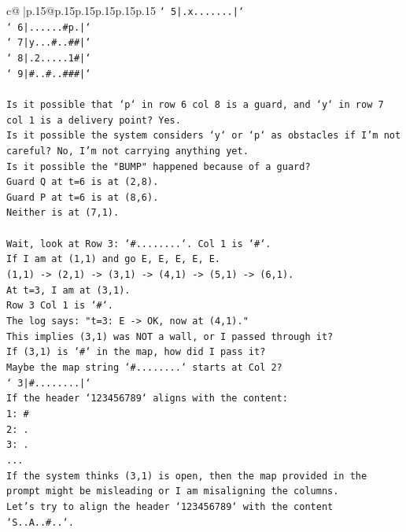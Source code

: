 \documentclass{article}
\begin{document}
{\begin{supertabular}{c@{$\;$}|p{.15\linewidth}@{}p{.15\linewidth}p{.15\linewidth}p{.15\linewidth}p{.15\linewidth}p{.15\linewidth}}
{{{\texttt{` 5|.x.......|`} \\
\texttt{` 6|......\#p.|`} \\
\texttt{` 7|y...\#..\#\#|`} \\
\texttt{` 8|.2.....1\#|`} \\
\texttt{` 9|\#..\#..\#\#\#|`} \\
\\ 
\texttt{Is it possible that `p` in row 6 col 8 is a guard, and `y` in row 7 col 1 is a delivery point? Yes.} \\
\texttt{Is it possible the system considers `y` or `p` as obstacles if I'm not careful? No, I'm not carrying anything yet.} \\
\texttt{Is it possible the "BUMP" happened because of a guard?} \\
\texttt{Guard Q at t=6 is at (2,8).} \\
\texttt{Guard P at t=6 is at (8,6).} \\
\texttt{Neither is at (7,1).} \\
\\ 
\texttt{Wait, look at Row 3: `\#........`. Col 1 is `\#`.} \\
\texttt{If I am at (1,1) and go E, E, E, E, E.} \\
\texttt{(1,1) {-}> (2,1) {-}> (3,1) {-}> (4,1) {-}> (5,1) {-}> (6,1).} \\
\texttt{At t=3, I am at (3,1).} \\
\texttt{Row 3 Col 1 is `\#`.} \\
\texttt{The log says: "t=3: E {-}> OK, now at (4,1)."} \\
\texttt{This implies (3,1) was NOT a wall, or I passed through it?} \\
\texttt{If (3,1) is `\#` in the map, how did I pass it?} \\
\texttt{Maybe the map string `\#........` starts at Col 2?} \\
\texttt{` 3|\#........|`} \\
\texttt{If the header `123456789` aligns with the content:} \\
\texttt{1: \#} \\
\texttt{2: .} \\
\texttt{3: .} \\
\texttt{...} \\
\texttt{If the system thinks (3,1) is open, then the map provided in the prompt might be misleading or I am misaligning the columns.} \\
\texttt{Let's try to align the header `123456789` with the content `S..A..\#..`.} \\
}}}
\end{supertabular}}
\end{document}
